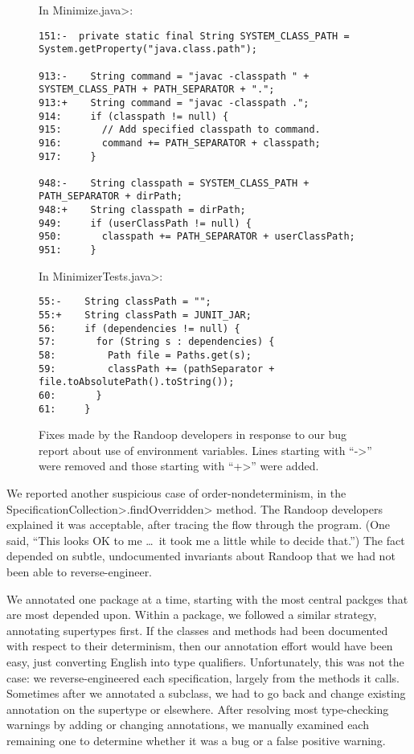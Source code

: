 \begin{figure}

\noindent
In \<Minimize.java>:

\begin{Verbatim}
151:-  private static final String SYSTEM_CLASS_PATH = System.getProperty("java.class.path");

913:-    String command = "javac -classpath " + SYSTEM_CLASS_PATH + PATH_SEPARATOR + ".";
913:+    String command = "javac -classpath .";
914:     if (classpath != null) {
915:       // Add specified classpath to command.
916:       command += PATH_SEPARATOR + classpath;
917:     }

948:-    String classpath = SYSTEM_CLASS_PATH + PATH_SEPARATOR + dirPath;
948:+    String classpath = dirPath;
949:     if (userClassPath != null) {
950:       classpath += PATH_SEPARATOR + userClassPath;
951:     }
\end{Verbatim}

\noindent
In \<MinimizerTests.java>:

\begin{Verbatim}
55:-    String classPath = "";
55:+    String classPath = JUNIT_JAR;
56:     if (dependencies != null) {
57:       for (String s : dependencies) {
58:         Path file = Paths.get(s);
59:         classPath += (pathSeparator + file.toAbsolutePath().toString());
60:       }
61:     }
\end{Verbatim}

\caption{Fixes made by the Randoop developers in response to our bug report
  about use of environment variables.  Lines starting with ``\<->'' were
  removed and those starting with ``\<+>'' were added.}
\label{fig:randoop-bug-getenv}
\end{figure}


We reported another suspicious case of order-nondeterminism, in the
\<SpecificationCollection>\-\<.findOverridden> method.  The Randoop developers explained it was
acceptable, after tracing the flow through the program.  (One said, ``This
looks OK to me \ldots\ it took me a little while to decide that.'')  The fact
depended on subtle, undocumented invariants about Randoop that we had not
been able to reverse-engineer.


We annotated one package at a time, starting with the most central packges
that are most depended upon.  Within a package, we followed a similar
strategy, annotating supertypes first.  If the classes and methods had been
documented with respect to their determinism, then our annotation effort
would have been easy, just converting English into type qualifiers.
Unfortunately, this was not the case: we reverse-engineered each
specification, largely from the methods it calls.  Sometimes after we
annotated a subclass, we had to go back and change existing annotation on
the supertype or elsewhere.
After resolving most type-checking warnings by adding or changing
annotations, we manually examined each remaining one to determine whether
it was a bug or a false positive warning.





